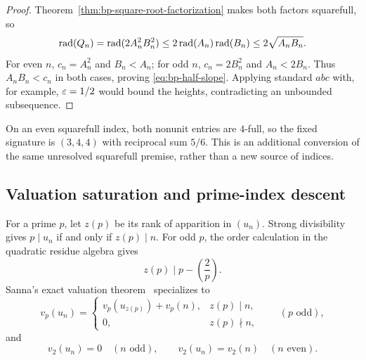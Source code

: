 \begin{proof}
Theorem~\ref{thm:bp-square-root-factorization} makes both factors squarefull,
so
\[
 \operatorname{rad}(Q_n)=\operatorname{rad}(2A_n^2B_n^2)
       \leq2\operatorname{rad}(A_n)\operatorname{rad}(B_n)\leq2\sqrt{A_nB_n}.
\]
For even $n$, $c_n=A_n^2$ and $B_n<A_n$; for odd $n$,
$c_n=2B_n^2$ and $A_n<2B_n$.  Thus $A_nB_n<c_n$ in both cases, proving
\eqref{eq:bp-half-slope}.  Applying standard $abc$ with, for example,
$\varepsilon=1/2$ would bound the heights, contradicting an unbounded subsequence.
\end{proof}

On an even squarefull index, both nonunit entries are $4$-full, so the fixed
signature is $(3,4,4)$ with reciprocal sum $5/6$.  This is an additional
conversion of the same unresolved squarefull premise, rather than a new
source of indices.

\subsection{Valuation saturation and prime-index descent}

For a prime $p$, let $z(p)$ be its rank of apparition in $(u_n)$.  Strong
divisibility gives $p\mid u_n$ if and only if $z(p)\mid n$.  For odd $p$,
the order calculation in the quadratic residue algebra gives
\begin{equation}\label{eq:bp-rank-bound}
                       z(p)\mid p-\left(\frac{2}{p}\right).
\end{equation}
Sanna's exact valuation theorem~\cite{Sanna2016} specializes to
\begin{equation}\label{eq:bp-Sanna}
 v_p(u_n)=
 \begin{cases}
  v_p(u_{z(p)})+v_p(n),&z(p)\mid n,\\
  0,&z(p)\nmid n,
 \end{cases}
 \qquad(p\text{ odd}),
\end{equation}
and
\[
 v_2(u_n)=0\quad(n\text{ odd}),\qquad
 v_2(u_n)=v_2(n)\quad(n\text{ even}).
\]

